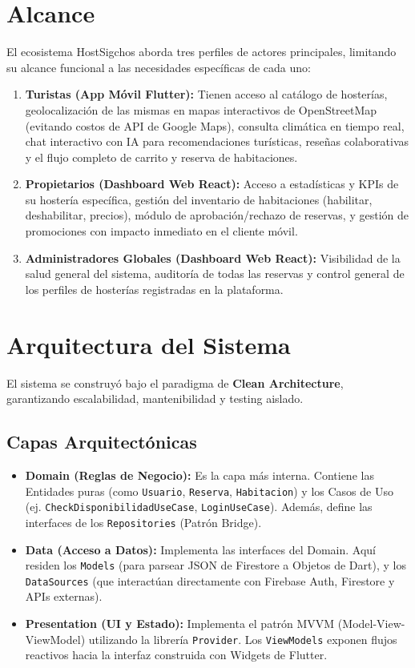 \documentclass{article}
\begin{document}
\section{Alcance}
El ecosistema HostSigchos aborda tres perfiles de actores principales, limitando su alcance funcional a las necesidades específicas de cada uno:

\begin{enumerate}
    \item \textbf{Turistas (App Móvil Flutter):} Tienen acceso al catálogo de hosterías, geolocalización de las mismas en mapas interactivos de OpenStreetMap (evitando costos de API de Google Maps), consulta climática en tiempo real, chat interactivo con IA para recomendaciones turísticas, reseñas colaborativas y el flujo completo de carrito y reserva de habitaciones.
    \item \textbf{Propietarios (Dashboard Web React):} Acceso a estadísticas y KPIs de su hostería específica, gestión del inventario de habitaciones (habilitar, deshabilitar, precios), módulo de aprobación/rechazo de reservas, y gestión de promociones con impacto inmediato en el cliente móvil.
    \item \textbf{Administradores Globales (Dashboard Web React):} Visibilidad de la salud general del sistema, auditoría de todas las reservas y control general de los perfiles de hosterías registradas en la plataforma.
\end{enumerate}

\section{Arquitectura del Sistema}
El sistema se construyó bajo el paradigma de \textbf{Clean Architecture}, garantizando escalabilidad, mantenibilidad y testing aislado.

\subsection{Capas Arquitectónicas}
\begin{itemize}[label=\small\color{verdeO}$\blacksquare$]
    \item \textbf{Domain (Reglas de Negocio):} Es la capa más interna. Contiene las Entidades puras (como \texttt{Usuario}, \texttt{Reserva}, \texttt{Habitacion}) y los Casos de Uso (ej. \texttt{CheckDisponibilidadUseCase}, \texttt{LoginUseCase}). Además, define las interfaces de los \texttt{Repositories} (Patrón Bridge).
    \item \textbf{Data (Acceso a Datos):} Implementa las interfaces del Domain. Aquí residen los \texttt{Models} (para parsear JSON de Firestore a Objetos de Dart), y los \texttt{DataSources} (que interactúan directamente con Firebase Auth, Firestore y APIs externas).
    \item \textbf{Presentation (UI y Estado):} Implementa el patrón MVVM (Model-View-ViewModel) utilizando la librería \texttt{Provider}. Los \texttt{ViewModels} exponen flujos reactivos hacia la interfaz construida con Widgets de Flutter.
\end{itemize}
\end{document}

